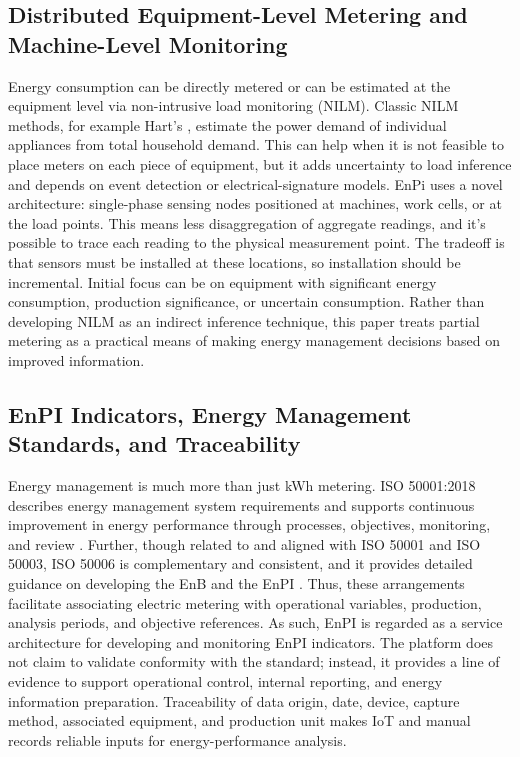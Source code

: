 \documentclass[technologies,article,submit,pdftex,moreauthors]{Definitions/mdpi}
\begin{document}
\subsection{Distributed Equipment-Level Metering and Machine-Level Monitoring}
\label{subsec:machine-level-monitoring}
Energy consumption can be directly metered or can be estimated at the equipment level via non-intrusive load monitoring (NILM). Classic NILM methods, for example Hart's \cite{ref21}, estimate the power demand of individual appliances from total household demand. This can help when it is not feasible to place meters on each piece of equipment, but it adds uncertainty to load inference and depends on event detection or electrical-signature models. EnPi uses a novel architecture: single-phase sensing nodes positioned at machines, work cells, or at the load points. This means less disaggregation of aggregate readings, and it's possible to trace each reading to the physical measurement point. The tradeoff is that sensors must be installed at these locations, so installation should be incremental. Initial focus can be on equipment with significant energy consumption, production significance, or uncertain consumption. Rather than developing NILM as an indirect inference technique, this paper treats partial metering as a practical means of making energy management decisions based on improved information. 
\subsection{EnPI Indicators, Energy Management Standards, and Traceability}
\label{subsec:enpi-standards}
Energy management is much more than just kWh metering. ISO 50001:2018 describes energy management system requirements and supports continuous improvement in energy performance through processes, objectives, monitoring, and review \cite{ref19}. Further, though related to and aligned with ISO 50001 and ISO 50003, ISO 50006 is complementary and consistent, and it provides detailed guidance on developing the EnB and the EnPI \cite{ref20}. Thus, these arrangements facilitate associating electric metering with operational variables, production, analysis periods, and objective references.
As such, EnPI is regarded as a service architecture for developing and monitoring EnPI indicators. The platform does not claim to validate conformity with the standard; instead, it provides a line of evidence to support operational control, internal reporting, and energy information preparation. Traceability of data origin, date, device, capture method, associated equipment, and production unit makes IoT and manual records reliable inputs for energy-performance analysis.
\end{document}
